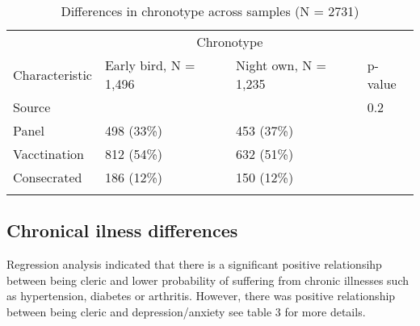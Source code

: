 \documentclass[ijerph,article,accept,moreauthors,pdftex]{mdpi}
\begin{document}
\begin{table}[!h]

\caption{\label{tab:contingenty tables}Differences in chronotype across samples (N = 2731)}
\centering
\begin{tabular}[t]{llll}
\toprule
\multicolumn{1}{c}{ } & \multicolumn{2}{c}{Chronotype} & \multicolumn{1}{c}{ } \\
\cmidrule(l{3pt}r{3pt}){2-3}{}
Characteristic & Early bird, N = 1,496 & Night own, N = 1,235 & p-value\\
\midrule{}
Source &  &  & 0.2\\
\hspace{1em}Panel & 498 (33\%) & 453 (37\%) & \\
\hspace{1em}Vacctination & 812 (54\%) & 632 (51\%) & \\
\hspace{1em}Consecrated & 186 (12\%) & 150 (12\%) & \\
\bottomrule{}
\end{tabular}
\end{table}

\hypertarget{chronical-ilness-differences}{%
\subsection{Chronical ilness
differences}\label{chronical-ilness-differences}}

Regression analysis indicated that there is a significant positive
relationsihp between being cleric and lower probability of suffering
from chronic illnesses such as hypertension, diabetes or arthritis.
However, there was positive relationship between being cleric and
depression/anxiety see table 3 for more details.
\end{document}
